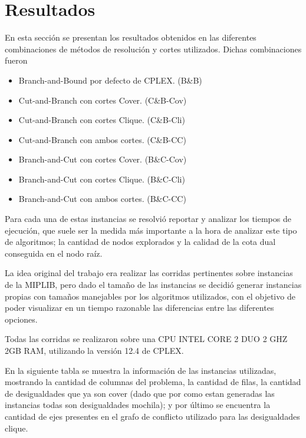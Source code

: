 \section{Resultados}


En esta secci\'on se presentan los resultados obtenidos en las diferentes combinaciones de m\'etodos de resoluci\'on y cortes utilizados. Dichas combinaciones fueron

\begin{itemize}
\item Branch-and-Bound por defecto de CPLEX. (B\&B)
\item Cut-and-Branch con cortes Cover. (C\&B-Cov)
\item Cut-and-Branch con cortes Clique. (C\&B-Cli)
\item Cut-and-Branch con ambos cortes. (C\&B-CC)
\item Branch-and-Cut con cortes Cover. (B\&C-Cov)
\item Branch-and-Cut con cortes Clique. (B\&C-Cli)
\item Branch-and-Cut con ambos cortes. (B\&C-CC)
\end{itemize}

Para cada una de estas instancias se resolvi\'o reportar y analizar los tiempos de ejecuci\'on, que suele ser la medida m\'as importante a la hora de analizar este tipo de algoritmos; la cantidad de nodos explorados y la calidad de la cota dual conseguida en el nodo ra\'iz.


La idea original del trabajo era realizar las corridas pertinentes sobre instancias de la MIPLIB, pero dado el tama\~no de las instancias se decidi\'o generar instancias propias con tama\~nos manejables por los algoritmos utilizados, con el objetivo de poder visualizar en un tiempo razonable las diferencias entre las diferentes opciones.

Todas las corridas se realizaron sobre una CPU INTEL CORE 2 DUO 2 GHZ 2GB RAM, utilizando la versi\'on 12.4 de CPLEX.


En la siguiente tabla se muestra la informaci\'on de las instancias utilizadas, mostrando la cantidad de columnas del problema, la cantidad de filas, la cantidad de desigualdades que ya son cover (dado que por como estan generadas las instancias todas son desigualdades mochila); y por \'ultimo se encuentra la cantidad de ejes presentes en el grafo de conflicto utilizado para las desigualdades clique.


